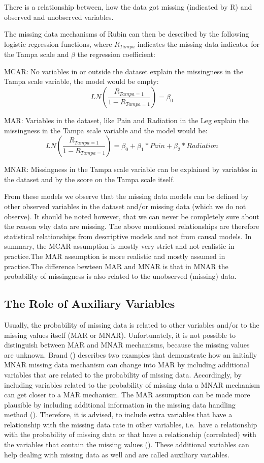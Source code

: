 \documentclass[]{book}
\begin{document}
There is a relationship between, how the data got missing (indicated by
R) and observed and unobserved variables.

The missing data mechanisms of Rubin can then be described by the
following logistic regression functions, where \(R_{Tampa}\) indicates
the missing data indicator for the Tampa scale and \(\beta\) the
regression coefficient:

MCAR: No variables in or outside the dataset explain the missingness in
the Tampa scale variable, the model would be empty:
\[LN(\frac{R_{Tampa=1}}{1-R_{Tampa=1}}) = \beta_0\]

MAR: Variables in the dataset, like Pain and Radiation in the Leg
explain the missingness in the Tampa scale variable and the model would
be:
\[LN(\frac{R_{Tampa=1}}{1-R_{Tampa=1}}) = \beta_0 + \beta_1 * Pain + \beta_2 * Radiation\]

MNAR: Missingness in the Tampa scale variable can be explained by
variables in the dataset and by the score on the Tampa scale itself.

From these models we observe that the missing data models can be defined
by other observed variables in the dataset and/or missing data (which we
do not observe). It should be noted however, that we can never be
completely sure about the reason why data are missing. The above
mentioned relationships are therefore statistical relationships from
descriptive models and not from causal models. In summary, the MCAR
assumption is mostly very strict and not realistic in practice.The MAR
assumption is more realistic and mostly assumed in practice.The
difference bewteen MAR and MNAR is that in MNAR the probability of
missingness is also related to the unobserved (missing) data.

\subsection{The Role of Auxiliary
Variables}\label{the-role-of-auxiliary-variables}

Usually, the probability of missing data is related to other variables
and/or to the missing values itself (MAR or MNAR). Unfortunately, it is
not possible to distinguish between MAR and MNAR mechanisms, because the
missing values are unknown. Brand (\citet{Brand1999}) describes two
examples that demonstrate how an initially MNAR missing data mechanism
can change into MAR by including additional variables that are related
to the probability of missing data. Accordingly, by including variables
related to the probability of missing data a MNAR mechanism can get
closer to a MAR mechanism. The MAR assumption can be made more plausible
by including additional information in the missing data handling method
(\citet{Baraldi2010}). Therefore, it is advised, to include extra
variables that have a relationship with the missing data rate in other
variables, i.e.~have a relationship with the probability of missing data
or that have a relationship (correlated) with the variables that contain
the missing values (\citet{Collins2001}). These additional variables can
help dealing with missing data as well and are called auxiliary
variables.
\end{document}
